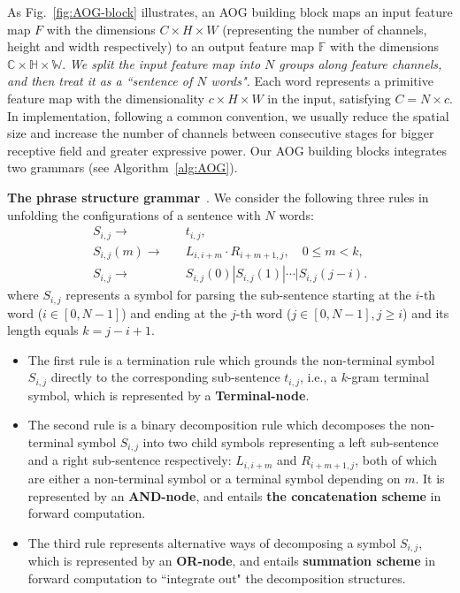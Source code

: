 \documentclass[10pt,twocolumn,letterpaper]{article}
\begin{document}
As Fig.~\ref{fig:AOG-block} illustrates, an AOG building block maps an input feature map $F$ with the dimensions  $C\times H\times W$ (representing the number of channels, height and width respectively) to an output feature map $\mathbb{F}$ with the dimensions $\mathbb{C}\times \mathbb{H}\times \mathbb{W}$. \emph{We split the input feature map into $N$ groups along feature channels, and then treat it as a ``sentence of $N$ words".} Each word represents a primitive feature map with the dimensionality $c\times H \times W$ in the input, satisfying $C=N\times c$. In implementation, following a common  convention, we usually reduce the spatial size and increase the number of channels between consecutive stages for bigger receptive field and greater expressive power. %
Our AOG building blocks integrates two grammars (see Algorithm~\ref{alg:AOG}). 

\textbf{The phrase structure grammar}~\cite{Syntactic,Geman_CompositionSystems,DPM,Zhu_Grammar,Yuille_AndOr,DisAOT-CVPR}. We consider the following three rules in unfolding the configurations of a sentence with $N$ words: 
\begin{align}
    S_{i,j}  \rightarrow & \quad t_{i,j}, \\
    S_{i,j}(m)  \rightarrow & \quad L_{i, i+m}\cdot R_{i+m+1, j}, \quad 0\leq m <k, \\
    S_{i,j} \rightarrow & \quad S_{i,j}(0) | S_{i,j}(1) | \cdots | S_{i,j}(j-i).
\end{align}
where $S_{i,j}$ represents a symbol for parsing the sub-sentence starting at the $i$-th word ($i\in [0, N-1]$) and ending at the $j$-th word ($j\in[0, N-1], j\geq i$) and its length equals $k=j-i+1$. 
\begin{itemize}[leftmargin=*]
\itemsep0em
    \item The first rule is a termination rule which grounds the non-terminal symbol $S_{i,j}$ directly to the corresponding sub-sentence $t_{i,j}$, i.e., a $k$-gram terminal symbol, which is represented by a \textbf{ Terminal-node}. 
    \item The second rule is a binary decomposition rule which decomposes the non-terminal symbol $S_{i,j}$ into two child symbols representing a left sub-sentence and a right sub-sentence respectively: $L_{i,i+m}$ and $R_{i+m+1,j}$, both of which are either a non-terminal symbol or a terminal symbol depending on $m$. It is represented by an \textbf{AND-node}, and entails \textbf{the concatenation scheme} in forward computation. 
    \item The third rule represents alternative ways of decomposing a symbol $S_{i,j}$, which is represented by an \textbf{OR-node}, and entails \textbf{summation scheme} in forward computation to ``integrate out" the decomposition structures. 
\end{itemize}
\end{document}
